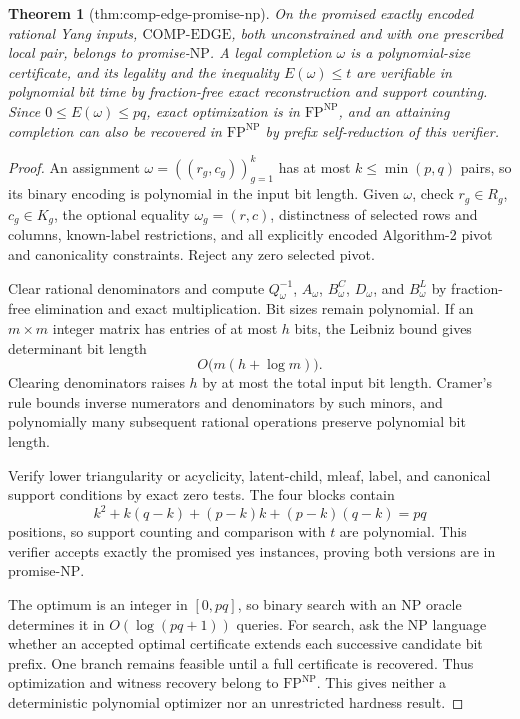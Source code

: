 \documentclass{article}
\newtheorem{theorem}{Theorem}
\begin{document}
\begin{theorem}[thm:comp-edge-promise-np]\label{thm:comp-edge-promise-np}
On the promised exactly encoded rational Yang inputs, \(\mathrm{COMP\text{-}EDGE}\), both unconstrained and with one prescribed local pair, belongs to promise-\(\mathrm{NP}\).  A legal completion \(\omega\) is a polynomial-size certificate, and its legality and the inequality \(E(\omega)\le t\) are verifiable in polynomial bit time by fraction-free exact reconstruction and support counting.  Since \(0\le E(\omega)\le pq\), exact optimization is in \(\mathrm{FP}^{\mathrm{NP}}\), and an attaining completion can also be recovered in \(\mathrm{FP}^{\mathrm{NP}}\) by prefix self-reduction of this verifier.
\end{theorem}
\begin{proof}
An assignment \(\omega=((r_g,c_g))_{g=1}^{k}\) has at most \(k\le\min(p,q)\) pairs, so its binary encoding is polynomial in the input bit length. Given \(\omega\), check \(r_g\in R_g\), \(c_g\in K_g\), the optional equality \(\omega_g=(r,c)\), distinctness of selected rows and columns, known-label restrictions, and all explicitly encoded Algorithm-2 pivot and canonicality constraints. Reject any zero selected pivot.

Clear rational denominators and compute \(Q_\omega^{-1}\), \(A_\omega\), \(B^C_\omega\), \(D_\omega\), and \(B^L_\omega\) by fraction-free elimination and exact multiplication. Bit sizes remain polynomial. If an \(m\times m\) integer matrix has entries of at most \(h\) bits, the Leibniz bound gives determinant bit length
\[
O\bigl(m(h+\log m)\bigr).
\]
Clearing denominators raises \(h\) by at most the total input bit length. Cramer's rule bounds inverse numerators and denominators by such minors, and polynomially many subsequent rational operations preserve polynomial bit length.

Verify lower triangularity or acyclicity, latent-child, mleaf, label, and canonical support conditions by exact zero tests. The four blocks contain
\[
k^2+k(q-k)+(p-k)k+(p-k)(q-k)=pq
\]
positions, so support counting and comparison with \(t\) are polynomial. This verifier accepts exactly the promised yes instances, proving both versions are in promise-\(\mathrm{NP}\).

The optimum is an integer in \([0,pq]\), so binary search with an \(\mathrm{NP}\) oracle determines it in \(O(\log(pq+1))\) queries. For search, ask the \(\mathrm{NP}\) language whether an accepted optimal certificate extends each successive candidate bit prefix. One branch remains feasible until a full certificate is recovered. Thus optimization and witness recovery belong to \(\mathrm{FP}^{\mathrm{NP}}\). This gives neither a deterministic polynomial optimizer nor an unrestricted hardness result.
\end{proof}
\end{document}
